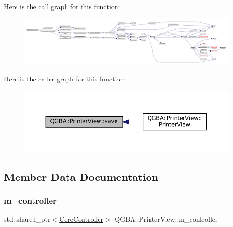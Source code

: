 Here is the call graph for this function\+:
\nopagebreak
\begin{figure}[H]
\begin{center}
\leavevmode
\includegraphics[width=350pt]{class_q_g_b_a_1_1_printer_view_ae8e7d2e4df544c0f17b3fb34036038f7_cgraph}
\end{center}
\end{figure}
Here is the caller graph for this function\+:
\nopagebreak
\begin{figure}[H]
\begin{center}
\leavevmode
\includegraphics[width=350pt]{class_q_g_b_a_1_1_printer_view_ae8e7d2e4df544c0f17b3fb34036038f7_icgraph}
\end{center}
\end{figure}


\subsection{Member Data Documentation}
\mbox{\label{class_q_g_b_a_1_1_printer_view_afedbebc930d1071233dcbaefff7bf35a}} 
\subsubsection{\texorpdfstring{m\+\_\+controller}{m\_controller}}
{\footnotesize\ttfamily std\+::shared\+\_\+ptr$<$\mbox{\hyperlink{class_q_g_b_a_1_1_core_controller}{Core\+Controller}}$>$ Q\+G\+B\+A\+::\+Printer\+View\+::m\+\_\+controller\hspace{0.3cm}{\ttfamily [private]}}

